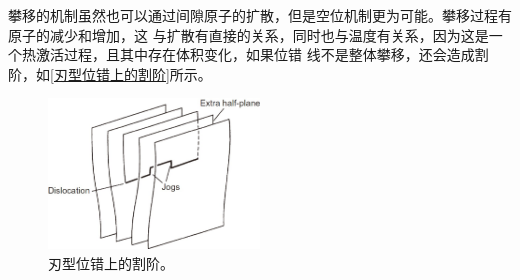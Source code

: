                 攀移的机制虽然也可以通过间隙原子的扩散，但是空位机制更为可能。攀移过程有原子的减少和增加，这
                与扩散有直接的关系，同时也与温度有关系，因为这是一个热激活过程，且其中存在体积变化，如果位错
                线不是整体攀移，还会造成割阶，如\autoref{刃型位错上的割阶}所示。
                \begin{figure}[ht]
                    \centering
                    \includegraphics[width=0.5\textwidth]{fig/A_pair_of_jogs_on_an_edge.jpg}
                    \caption{刃型位错上的割阶。}
                    \label{刃型位错上的割阶}
                \end{figure}

